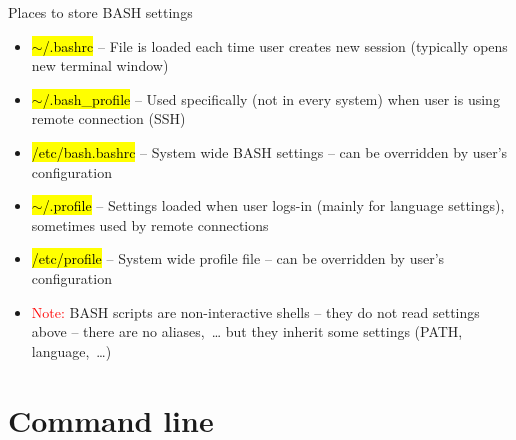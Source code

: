 \documentclass[compress, ucs, xelatex, 11pt, xcolor=svgnames,
  hyperref={
    bookmarks=true,
    unicode=true,
    colorlinks=true,
    pdftitle={Linux, command line and MetaCentrum},
    plainpages=false,
    pdfauthor={Vojtech Zeisek},
    pdfsubject={Course about use of Linux command line, writing shell scripts and using MetaCentrum of CESNET},
    pdfcreator={XeLaTeX},
    pdfkeywords={Linux, GNU, BASH, shell, command line, MetaCentrum},
    linkcolor=Red,
    anchorcolor=Blue,
    citecolor=Purple,
    filecolor=DodgerBlue,
    menucolor=DarkOrchid,
    urlcolor=DeepSkyBlue,
    pdftex},
  url={hyphens, lowtilde} %
  ]{beamer}
\renewcommand{\texttt}[1]{\hl{\ttfamily #1}}
\renewcommand{\alert}[1]{\textcolor{red}{#1}}
\begin{document}
\begin{frame}{Places to store BASH settings}
  \begin{itemize}
    \item \texttt{$\sim$/.bashrc} -- File is loaded each time user creates new session (typically opens new terminal window)
    \item \texttt{$\sim$/.bash\_profile} -- Used specifically (not in every system) when user is using remote connection (SSH)
    \item \texttt{/etc/bash.bashrc} -- System wide BASH settings -- can be overridden by user's configuration
    \item \texttt{$\sim$/.profile} -- Settings loaded when user logs-in (mainly for language settings), sometimes used by remote connections
    \item \texttt{/etc/profile} -- System wide profile file -- can be overridden by user's configuration
    \item \alert{Note:} BASH scripts are non-interactive shells -- they do not read settings above -- there are no aliases,~\ldots{ }but they inherit some settings (PATH, language,~\ldots)
  \end{itemize}
\end{frame}

\section{Command line}
\end{document}
